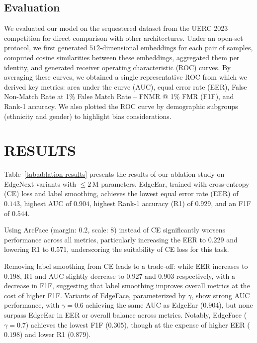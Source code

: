 \documentclass[a4paper, 10pt, conference]{ieeeconf}
\begin{document}
\subsection{Evaluation}
\label{subsec:evaluation}

We evaluated our model on the sequestered dataset from the UERC 2023 competition for direct comparison with other architectures. Under an open-set protocol, we first generated $512$-dimensional embeddings for each pair of samples, computed cosine similarities between these embeddings, aggregated them per identity, and generated receiver operating characteristic (ROC) curves. By averaging these curves, we obtained a single representative ROC from which we derived key metrics: area under the curve (AUC), equal error rate (EER), False Non-Match Rate at 1\% False Match Rate – FNMR @ 1\% FMR (F1F), and Rank-1 accuracy. We also plotted the ROC curve by demographic subgroups (ethnicity and gender) to highlight bias considerations.



\section{RESULTS}

Table~\ref{tab:ablation-results} presents the results of our ablation study on EdgeNext variants with $\leq 2\,\mathrm{M}$ parameters. EdgeEar, trained with cross-entropy (CE) loss and label smoothing, achieves the lowest equal error rate (EER) of $0.143$, highest AUC of $0.904$, highest Rank-1 accuracy (R1) of $0.929$, and an F1F of $0.544$. 

Using ArcFace (margin: $0.2$, scale: $8$) instead of CE significantly worsens performance across all metrics, particularly increasing the EER to $0.229$ and lowering R1 to $0.571$, underscoring the suitability of CE loss for this task.

Removing label smoothing from CE leads to a trade-off: while EER increases to $0.198$, R1 and AUC slightly decrease to $0.927$ and $0.903$ respectively, with a decrease in F1F, suggesting that label smoothing improves overall metrics at the cost of higher F1F. Variants of EdgeFace, parameterized by $\gamma$, show strong AUC performance, with $\gamma = 0.6$ achieving the same AUC as EdgeEar ($0.904$), but none surpass EdgeEar in EER or overall balance across metrics. Notably, EdgeFace ($\gamma = 0.7$) achieves the lowest F1F ($0.305$), though at the expense of higher EER ($0.198$) and lower R1 ($0.879$).
\end{document}
